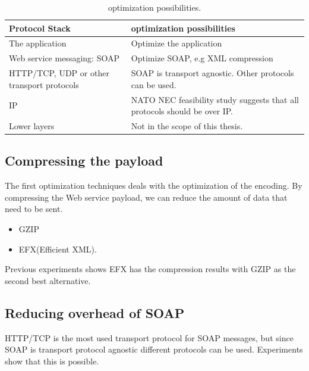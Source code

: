 \documentclass[USenglish]{article}
\begin{document}
\begin{table}[h]
\begin{tabularx}{\textwidth}{| X | X |}
\hline
  \textbf{Protocol Stack} & \textbf{optimization possibilities} \\ \hline
  The application & Optimize the application\\ \hline
  Web service messaging: SOAP & Optimize SOAP, e.g XML compression \\ \hline
  HTTP/TCP, UDP or other transport protocols & SOAP is transport agnostic. Other protocols can be used. \\ \hline
  IP & NATO NEC feasibility study suggests that all protocols should be over IP. \\ \hline
  Lower layers & Not in the scope of this thesis. \\ \hline
\end{tabularx}
\caption{optimization possibilities.} \label{table:optimalization-overview}
\end{table}


\subsection{Compressing the payload}
The first optimization techniques deals with the optimization of the encoding. By compressing the Web service payload, we can reduce the amount of data that need to be sent.
\begin{itemize}
\item GZIP
\item EFX(Efficient XML).
\end{itemize}
Previous experiments shows EFX has the compression results with GZIP as the second best alternative\cite{johnsen-trude-compression-techniqes}.

\subsection{Reducing overhead of SOAP}
HTTP/TCP is the most used transport protocol for SOAP messages, but since SOAP is transport protocol agnostic different protocols can be used. Experiments show that this is possible.
\end{document}
